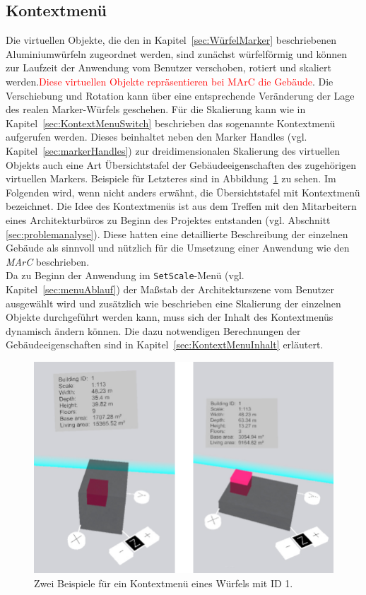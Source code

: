 \subsection{Kontextmenü}\label{sec:kontextMenu}
Die virtuellen Objekte, die den in Kapitel~\ref{sec:WürfelMarker} beschriebenen Aluminiumwürfeln zugeordnet werden, sind zunächst würfelförmig und können zur Laufzeit der Anwendung vom Benutzer verschoben, rotiert und skaliert werden.\textcolor{red}{Diese virtuellen Objekte repräsentieren bei MArC die Gebäude}.  Die Verschiebung und Rotation kann über eine entsprechende Veränderung der Lage des realen Marker-Würfels geschehen. Für die Skalierung kann wie in Kapitel~\ref{sec:KontextMenuSwitch} beschrieben das sogenannte Kontextmenü aufgerufen werden. Dieses beinhaltet neben den Marker Handles (vgl. Kapitel~\ref{sec:markerHandles}) zur dreidimensionalen Skalierung des virtuellen Objekts auch eine Art Übersichtstafel der Gebäudeeigenschaften des zugehörigen virtuellen Markers. Beispiele für Letzteres sind in Abbildung~\ref{fig:KontextmenuExamples} zu sehen. Im Folgenden wird, wenn nicht anders erwähnt, die Übersichtstafel mit \glqq Kontextmenü\grqq{} bezeichnet. Die Idee des Kontextmenüs ist aus dem Treffen mit den Mitarbeitern eines Architekturbüros zu Beginn des Projektes entstanden (vgl. Abschnitt \ref{sec:problemanalyse}). Diese hatten eine detaillierte Beschreibung der einzelnen Gebäude als sinnvoll und nützlich für die Umsetzung einer Anwendung wie den \textit{MArC} beschrieben.\\
Da zu Beginn der Anwendung im \texttt{SetScale}-Menü (vgl. Kapitel~\ref{sec:menuAblauf}) der Maßstab der Architekturszene vom Benutzer ausgewählt wird und zusätzlich wie beschrieben eine Skalierung der einzelnen Objekte durchgeführt werden kann, muss sich der Inhalt des Kontextmenüs dynamisch ändern können. Die dazu notwendigen Berechnungen der Gebäudeeigenschaften sind in Kapitel~\ref{sec:KontextMenuInhalt} erläutert. 

\begin{figure}[H]
	\centering
	\includegraphics[scale=.3]{Bilder/Eigene Fotos/KontextMenue.jpg}
	\caption{Zwei Beispiele für ein Kontextmenü eines Würfels mit ID 1.}
	\label{fig:KontextmenuExamples}
\end{figure}


